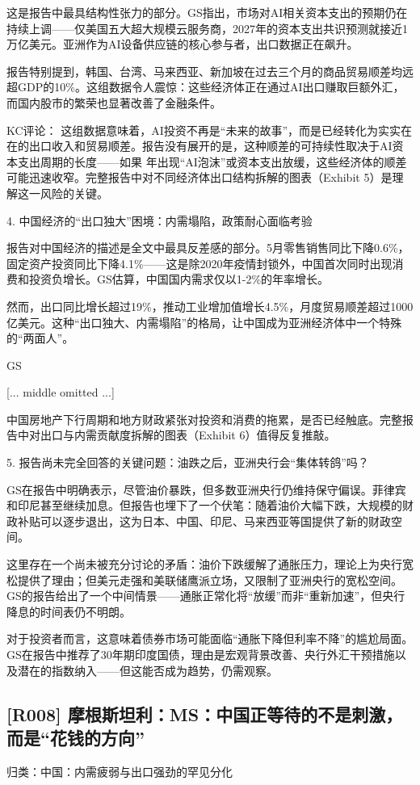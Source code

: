 \documentclass[11pt]{ctexart}
\begin{document}
这是报告中最具结构性张力的部分。GS指出，市场对AI相关资本支出的预期仍在持续上调——仅美国五大超大规模云服务商，2027年的资本支出共识预测就接近1万亿美元。亚洲作为AI设备供应链的核心参与者，出口数据正在飙升。

报告特别提到，韩国、台湾、马来西亚、新加坡在过去三个月的商品贸易顺差均远超GDP的10\%。这组数据令人震惊：这些经济体正在通过AI出口赚取巨额外汇，而国内股市的繁荣也显著改善了金融条件。

KC评论： 这组数据意味着，AI投资不再是“未来的故事”，而是已经转化为实实在在的出口收入和贸易顺差。报告没有展开的是，这种顺差的可持续性取决于AI资本支出周期的长度——如果 年出现“AI泡沫”或资本支出放缓，这些经济体的顺差可能迅速收窄。完整报告中对不同经济体出口结构拆解的图表（Exhibit 5）是理解这一风险的关键。

4. 中国经济的“出口独大”困境：内需塌陷，政策耐心面临考验

报告对中国经济的描述是全文中最具反差感的部分。5月零售销售同比下降0.6\%，固定资产投资同比下降4.1\%——这是除2020年疫情封锁外，中国首次同时出现消费和投资负增长。GS估算，中国国内需求仅以1-2\%的年率增长。

然而，出口同比增长超过19\%，推动工业增加值增长4.5\%，月度贸易顺差超过1000亿美元。这种“出口独大、内需塌陷”的格局，让中国成为亚洲经济体中一个特殊的“两面人”。

GS

[... middle omitted ...]

中国房地产下行周期和地方财政紧张对投资和消费的拖累，是否已经触底。完整报告中对出口与内需贡献度拆解的图表（Exhibit 6）值得反复推敲。

5. 报告尚未完全回答的关键问题：油跌之后，亚洲央行会“集体转鸽”吗？

GS在报告中明确表示，尽管油价暴跌，但多数亚洲央行仍维持保守偏误。菲律宾和印尼甚至继续加息。但报告也埋下了一个伏笔：随着油价大幅下跌，大规模的财政补贴可以逐步退出，这为日本、中国、印尼、马来西亚等国提供了新的财政空间。

这里存在一个尚未被充分讨论的矛盾：油价下跌缓解了通胀压力，理论上为央行宽松提供了理由；但美元走强和美联储鹰派立场，又限制了亚洲央行的宽松空间。GS的报告给出了一个中间情景——通胀正常化将“放缓”而非“重新加速”，但央行降息的时间表仍不明朗。

对于投资者而言，这意味着债券市场可能面临“通胀下降但利率不降”的尴尬局面。GS在报告中推荐了30年期印度国债，理由是宏观背景改善、央行外汇干预措施以及潜在的指数纳入——但这能否成为趋势，仍需观察。

\subsection{[R008] 摩根斯坦利：MS：中国正等待的不是刺激，而是“花钱的方向”}
{\small\color{refgray}归类：中国：内需疲弱与出口强劲的罕见分化}
\end{document}
